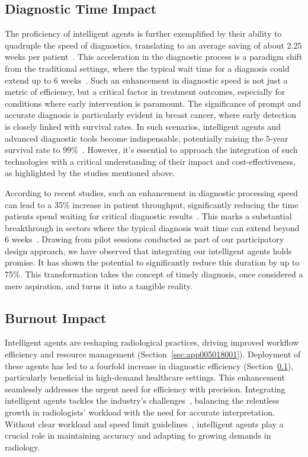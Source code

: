 \subsection{Diagnostic Time Impact}
\label{sec:app005018002}

\textcolor{revised}{The proficiency of intelligent agents is further exemplified by their ability to quadruple the speed of diagnostics, translating to an average saving of about 2.25 weeks per patient~\cite{WAYMEL2019327}.
This acceleration in the diagnostic process is a paradigm shift from the traditional settings, where the typical wait time for a diagnosis could extend up to 6 weeks~\cite{https://doi.org/10.1002/cncr.32910}.
Such an enhancement in diagnostic speed is not just a metric of efficiency, but a critical factor in treatment outcomes, especially for conditions where early intervention is paramount.
The significance of prompt and accurate diagnosis is particularly evident in breast cancer, where early detection is closely linked with survival rates.
In such scenarios, intelligent agents and advanced diagnostic tools become indispensable, potentially raising the 5-year survival rate to 99\%~\cite{DIN2022106073}.
However, it's essential to approach the integration of such technologies with a critical understanding of their impact and cost-effectiveness, as highlighted by the studies mentioned above.}

\textcolor{revised}{According to recent studies, such an enhancement in diagnostic processing speed can lead to a 35\% increase in patient throughput, significantly reducing the time patients spend waiting for critical diagnostic results~\cite{doi:10.1148/radiol.212631}.
This marks a substantial breakthrough in sectors where the typical diagnosis wait time can extend beyond 6 weeks~\cite{https://doi.org/10.1002/cncr.32910}.
Drawing from pilot sessions conducted as part of our participatory design approach, we have observed that integrating our intelligent agents holds promise.
It has shown the potential to significantly reduce this duration by up to 75\%.
This transformation takes the concept of timely diagnosis, once considered a mere aspiration, and turns it into a tangible reality.}

\subsection{Burnout Impact}
\label{sec:app005018003}

\textcolor{revised}{Intelligent agents are reshaping radiological practices, driving improved workflow efficiency and resource management (Section~\ref{sec:app005018001}).
Deployment of these agents has led to a fourfold increase in diagnostic efficiency (Section~\ref{sec:app005018002}), particularly beneficial in high-demand healthcare settings.
This enhancement seamlessly addresses the urgent need for efficiency with precision.
Integrating intelligent agents tackles the industry's challenges~\cite{doi:10.1148/radiol.210948}, balancing the relentless growth in radiologists' workload with the need for accurate interpretation.
Without clear workload and speed limit guidelines~\cite{KOHLI2018535}, intelligent agents play a crucial role in maintaining accuracy and adapting to growing demands in radiology.}

